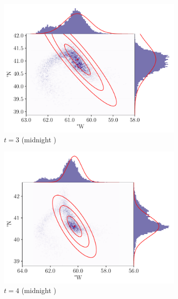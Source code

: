 \begin{figure}
\begin{subfigure}{0.49\textwidth}
		\includegraphics[width=\textwidth]{chp06_applications/figures/gulf_stream/traj_stoch_em_3.0}
		\caption{\(t = 3\) (midnight )}
		\label{fig:natl_em_3}
	\end{subfigure}
	\begin{subfigure}{0.49\textwidth}
		\includegraphics[width=\textwidth]{chp06_applications/figures/gulf_stream/traj_stoch_em_4.0}
		\caption{\(t = 4\) (midnight )}
	\end{subfigure}
	\begin{subfigure}{0.49\textwidth}

\end{subfigure}
\end{figure}
